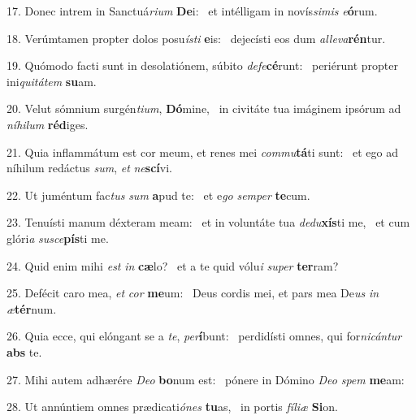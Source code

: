 17. Donec intrem in Sanctuá\textit{ri}\textit{um} \textbf{De}i: \ast\  et intélligam in novís\textit{si}\textit{mis} \textit{e}\textbf{ó}rum.\

18. Verúmtamen propter dolos posu\textit{ís}\textit{ti} \textbf{e}is: \ast\  dejecísti eos dum \textit{al}\textit{le}\textit{va}\textbf{rén}tur.\

19. Quómodo facti sunt in desolatiónem, súbito \textit{de}\textit{fe}\textbf{cé}runt: \ast\  periérunt propter ini\textit{qui}\textit{tá}\textit{tem} \textbf{su}am.\

20. Velut sómnium surgén\textit{ti}\textit{um}, \textbf{Dó}mine, \ast\  in civitáte tua imáginem ipsórum ad \textit{ní}\textit{hi}\textit{lum} \textbf{réd}iges.\

21. Quia inflammátum est cor meum, et renes mei \textit{com}\textit{mu}\textbf{tá}ti sunt: \ast\  et ego ad níhilum redáctus \textit{sum}, \textit{et} \textit{ne}\textbf{scí}vi.\

22. Ut juméntum fac\textit{tus} \textit{sum} \textbf{a}pud te: \ast\  et e\textit{go} \textit{sem}\textit{per} \textbf{te}cum.\

23. Tenuísti manum déxteram meam: \dag\  et in voluntáte tua \textit{de}\textit{du}\textbf{xís}ti me, \ast\  et cum glóri\textit{a} \textit{su}\textit{sce}\textbf{pís}ti me.\

24. Quid enim mihi \textit{est} \textit{in} \textbf{cæ}lo? \ast\  et a te quid vólu\textit{i} \textit{su}\textit{per} \textbf{ter}ram?\

25. Defécit caro mea, \textit{et} \textit{cor} \textbf{me}um: \ast\  Deus cordis mei, et pars mea De\textit{us} \textit{in} \textit{æ}\textbf{tér}num.\

26. Quia ecce, qui elóngant se a \textit{te}, \textit{per}\textbf{í}bunt: \ast\  perdidísti omnes, qui for\textit{ni}\textit{cán}\textit{tur} \textbf{abs} te.\

27. Mihi autem adhærére \textit{De}\textit{o} \textbf{bo}num est: \ast\  pónere in Dómino \textit{De}\textit{o} \textit{spem} \textbf{me}am:\

28. Ut annúntiem omnes prædicati\textit{ó}\textit{nes} \textbf{tu}as, \ast\  in portis \textit{fí}\textit{li}\textit{æ} \textbf{Si}on.\

